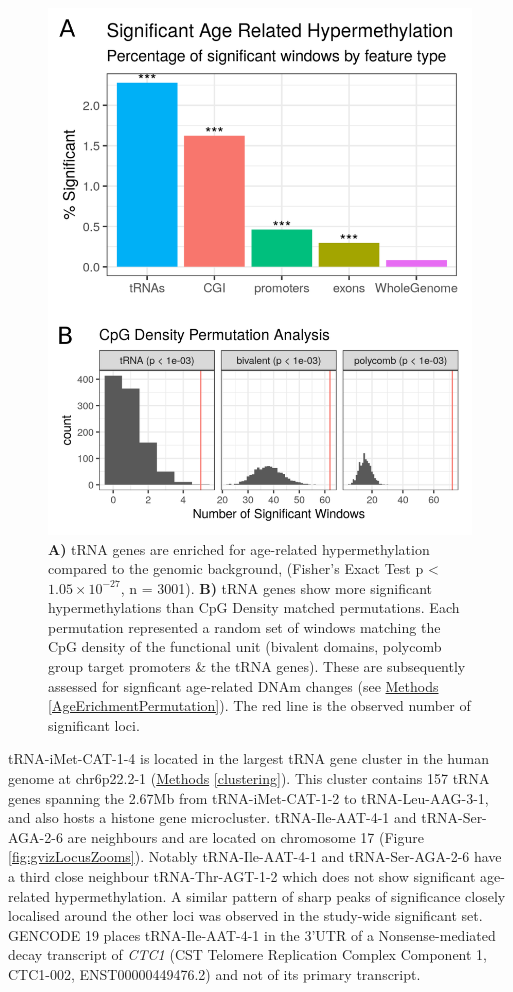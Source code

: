 \documentclass[
]{book}
\begin{document}
\begin{figure}

{\centering \includegraphics[width=0.6\linewidth]{./figs/permutation-proportion} 

}

\caption{\textbf{A)} tRNA genes are enriched for age-related hypermethylation compared to the genomic background, (Fisher's Exact Test p \textless{} \(1.05\times10^{-27}\), n = 3001). \textbf{B)} tRNA genes show more significant hypermethylations than CpG Density matched permutations. Each permutation represented a random set of windows matching the CpG density of the functional unit (bivalent domains, polycomb group target promoters \& the tRNA genes). These are subsequently assessed for signficant age-related DNAm changes (see \protect\hyperlink{AgeErichmentPermutation}{Methods} \ref{AgeErichmentPermutation}). The red line is the observed number of significant loci.}\label{fig:sizePropEnrich}
\end{figure}



tRNA-iMet-CAT-1-4 is located in the largest tRNA gene cluster in the human genome at chr6p22.2-1 (\protect\hyperlink{clustering}{Methods} \ref{clustering}).
This cluster contains 157 tRNA genes spanning the 2.67Mb from tRNA-iMet-CAT-1-2 to tRNA-Leu-AAG-3-1, and also hosts a histone gene microcluster.
tRNA-Ile-AAT-4-1 and tRNA-Ser-AGA-2-6 are neighbours and are located on chromosome 17 (Figure \ref{fig:gvizLocusZooms}).
Notably tRNA-Ile-AAT-4-1 and tRNA-Ser-AGA-2-6 have a third close neighbour tRNA-Thr-AGT-1-2 which does not show significant age-related hypermethylation.
A similar pattern of sharp peaks of significance closely localised around the other loci was observed in the study-wide significant set.
GENCODE 19 places tRNA-Ile-AAT-4-1 in the 3'UTR of a Nonsense-mediated decay transcript of \emph{CTC1} (CST Telomere Replication Complex Component 1, CTC1-002, ENST00000449476.2) and not of its primary transcript.
\end{document}
